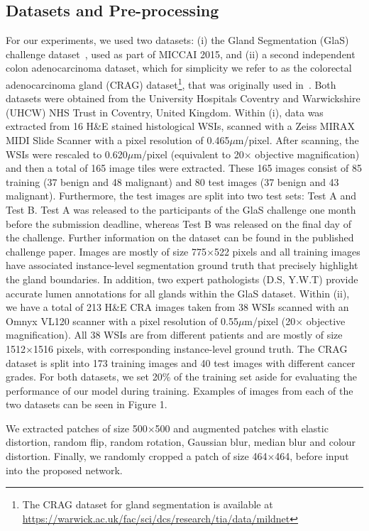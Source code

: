 \documentclass[3p]{elsarticle}
\begin{document}
\subsection{Datasets and Pre-processing}
For our experiments, we used two datasets: (i) the Gland Segmentation (GlaS) challenge dataset~\citep{sirinukunwattana2017gland}, used as part of MICCAI 2015, and (ii) a second independent colon adenocarcinoma dataset, which for simplicity we refer to as the colorectal adenocarcinoma gland (CRAG) dataset\footnote{The CRAG dataset for gland segmentation is available at \url{https://warwick.ac.uk/fac/sci/dcs/research/tia/data/mildnet}}, that was originally used in~\cite{awan2017glandular}. Both datasets were obtained from the University Hospitals Coventry and Warwickshire (UHCW) NHS Trust in Coventry, United Kingdom. Within (i), data was extracted from 16 H\&E stained histological WSIs, scanned with a Zeiss MIRAX MIDI Slide Scanner with a pixel resolution of 0.465$\mu$m/pixel. After scanning, the WSIs were rescaled to 0.620$\mu$m/pixel (equivalent to 20$\times$ objective magnification) and then a total of 165 image tiles were extracted. These 165 images consist of 85 training (37 benign and 48 malignant) and 80 test images (37 benign and 43 malignant). Furthermore, the test images are split into two test sets: Test A and Test B. Test A was released to the participants of the GlaS challenge one month before the submission deadline, whereas Test B was released on the final day of the challenge. Further information on the dataset can be found in the published challenge paper\citep{sirinukunwattana2017gland}. Images are mostly of size 775$\times$522 pixels and all training images have associated instance-level segmentation ground truth that precisely highlight the gland boundaries. In addition, two expert pathologists (D.S, Y.W.T) provide accurate lumen annotations for all glands within the GlaS dataset. Within (ii), we have a total of 213 H\&E CRA images taken from 38 WSIs scanned with an Omnyx VL120 scanner with a pixel resolution of 0.55$\mu$m/pixel (20$\times$ objective magnification). All 38 WSIs are from different patients and are mostly of size 1512$\times$1516 pixels, with corresponding instance-level ground truth. The CRAG dataset is split into 173 training images and 40 test images with different cancer grades. For both datasets, we set 20\% of the training set aside for evaluating the performance of our model during training. Examples of images from each of the two datasets can be seen in Figure 1.

We extracted patches of size 500$\times$500 and augmented patches with elastic distortion, random flip, random rotation, Gaussian blur, median blur and colour distortion. Finally, we randomly cropped a patch of size 464$\times$464, before input into the proposed network.
\end{document}
